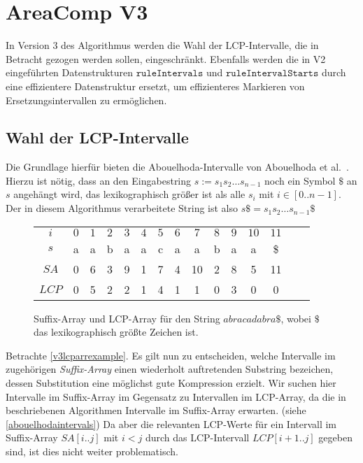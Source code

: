 \section{AreaComp V3}

In Version 3 des Algorithmus werden die Wahl der LCP-Intervalle, die in Betracht gezogen werden sollen, eingeschränkt. Ebenfalls werden die in V2 eingeführten Datenstrukturen $\texttt{ruleIntervals}$ und $\texttt{ruleIntervalStarts}$ durch eine effizientere Datenstruktur ersetzt, um effizienteres Markieren von Ersetzungsintervallen zu ermöglichen. 

\subsection{Wahl der LCP-Intervalle}
\label{lcpchoice}

Die Grundlage hierfür bieten die Abouelhoda-Intervalle von Abouelhoda et al.\ \cite{abouelhoda_optimal_2002}.
Hierzu ist nötig, dass an den Eingabestring $s := s_1s_2\dots s_{n-1}$ noch ein Symbol $\$$ an $s$ angehängt wird, das lexikographisch größer ist als alle $s_i$ mit $i \in [0..n-1]$. Der in diesem Algorithmus verarbeitete String ist also $s\$ = s_1s_2\dots s_{n-1}\$$
\begin{figure}
	\centering
    \begin{tabular}{c|c|c|c|c|c|c|c|c|c|c|c|c|c|c|}
        \multicolumn{1}{c}{$i$} & \multicolumn{1}{c}{$0$} & \multicolumn{1}{c}{$1$} & \multicolumn{1}{c}{$2$} & \multicolumn{1}{c}{$3$} & \multicolumn{1}{c}{$4$} & \multicolumn{1}{c}{$5$} & \multicolumn{1}{c}{$6$} & \multicolumn{1}{c}{$7$} & \multicolumn{1}{c}{$8$} & \multicolumn{1}{c}{$9$} & \multicolumn{1}{c}{$10$} & \multicolumn{1}{c}{$11$}\\\cline{2-13}
        $s$   & a & a & b & a & a & c & a & a & b & a & a & \$\\\cline{2-13}
        $SA$  & 0 & 6 & 3 & 9 & 1 & 7 & 4 & 10 & 2 & 8 & 5 & 11\\\cline{2-13}
        $LCP$ & 0 & 5 & 2 & 2 & 1 & 4 & 1 & 1 & 0 & 3 & 0 & 0\\\cline{2-13}
    \end{tabular}
    \caption{Suffix-Array und LCP-Array für den String $abracadabra\$$, wobei $\$$ das lexikographisch größte Zeichen ist.}
    \label{v3lcparrexample}
\end{figure}

Betrachte \autoref{v3lcparrexample}.
Es gilt nun zu entscheiden, welche Intervalle im zugehörigen \emph{Suffix-Array} einen wiederholt auftretenden Substring bezeichen, dessen Substitution eine möglichst gute Kompression erzielt.
Wir suchen hier Intervalle im Suffix-Array im Gegensatz zu Intervallen im LCP-Array, da die in \cite{abouelhoda_optimal_2002} beschriebenen Algorithmen Intervalle im Suffix-Array erwarten. (siehe \autoref{abouelhodaintervals})
Da aber die relevanten LCP-Werte für ein Intervall im Suffix-Array $SA[i..j]$ mit $i < j$ durch das LCP-Intervall $LCP[i+1..j]$ gegeben sind, ist dies nicht weiter problematisch. 

